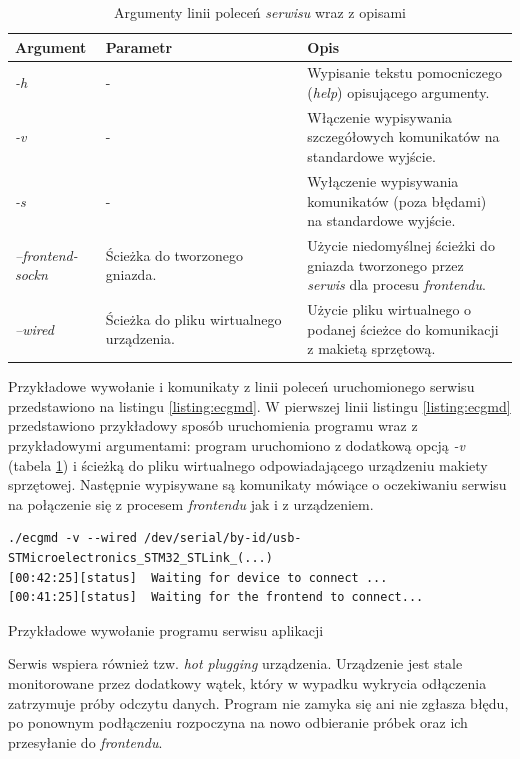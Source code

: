 \begin{table}[h!]
\centering
    \caption{Argumenty linii poleceń \textit{serwisu} wraz z opisami}
\label{tab:daemon-cmd-args}
    \begin{tabular}{|p{0.18\linewidth}|p{0.4\linewidth}|p{0.42\linewidth}|}
\hline
    \textbf{Argument} & \textbf{Parametr} & \textbf{Opis}        \\ \hline
    \textit{-h} & - & Wypisanie tekstu pomocniczego (\textit{help}) opisującego argumenty.\\ \hline
    \textit{-v} & - & Włączenie wypisywania szczegółowych komunikatów na standardowe wyjście.   \\ \hline
    \textit{-s} & - & Wyłączenie wypisywania komunikatów (poza błędami) na standardowe wyjście. \\ \hline
    \textit{--frontend-sockn} & Ścieżka do tworzonego gniazda. & Użycie niedomyślnej ścieżki do gniazda tworzonego przez \textit{serwis} dla procesu \textit{frontendu}. \\ \hline
    \textit{--wired} & Ścieżka do pliku wirtualnego urządzenia. & Użycie pliku wirtualnego o podanej ścieżce do komunikacji z makietą sprzętową. \\ \hline
\end{tabular}
\end{table}

Przykładowe wywołanie i komunikaty z linii poleceń uruchomionego serwisu przedstawiono na listingu \ref{listing:ecgmd}.
W pierwszej linii listingu \ref{listing:ecgmd} przedstawiono przykładowy sposób uruchomienia programu wraz z przykładowymi
argumentami: program uruchomiono z dodatkową opcją \textit{-v} (tabela \ref{tab:daemon-cmd-args}) i ścieżką do pliku wirtualnego
odpowiadającego urządzeniu makiety sprzętowej. Następnie wypisywane są komunikaty mówiące o oczekiwaniu serwisu na połączenie
się z procesem \textit{frontendu} jak i z urządzeniem.

\begin{listing}
\begin{verbatim}
./ecgmd -v --wired /dev/serial/by-id/usb-STMicroelectronics_STM32_STLink_(...)
[00:42:25][status] 	Waiting for device to connect ...
[00:41:25][status] 	Waiting for the frontend to connect...
\end{verbatim}
    \caption{Przykładowe wywołanie programu serwisu aplikacji}
\label{listing:ecgmd}
\end{listing}

Serwis wspiera również tzw. \textit{hot plugging} urządzenia. Urządzenie jest stale
monitorowane przez dodatkowy wątek, który w wypadku wykrycia odłączenia zatrzymuje próby odczytu danych.
Program nie zamyka się ani nie zgłasza błędu, po ponownym podłączeniu rozpoczyna na nowo odbieranie
próbek oraz ich przesyłanie do \textit{frontendu}.

